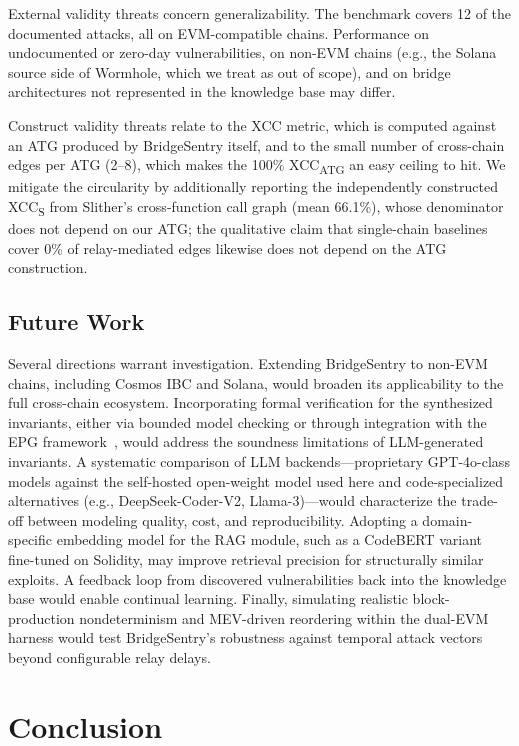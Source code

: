\documentclass[journal]{IEEEtran}
\begin{document}
External validity threats concern generalizability. The benchmark covers 12 of the documented attacks, all on EVM-compatible chains. Performance on undocumented or zero-day vulnerabilities, on non-EVM chains (e.g., the Solana source side of Wormhole, which we treat as out of scope), and on bridge architectures not represented in the knowledge base may differ.

Construct validity threats relate to the XCC metric, which is computed against an ATG produced by BridgeSentry itself, and to the small number of cross-chain edges per ATG (2--8), which makes the 100\% XCC\textsubscript{ATG} an easy ceiling to hit. We mitigate the circularity by additionally reporting the independently constructed XCC\textsubscript{S} from Slither's cross-function call graph (mean 66.1\%), whose denominator does not depend on our ATG; the qualitative claim that single-chain baselines cover 0\% of relay-mediated edges likewise does not depend on the ATG construction.

\subsection{Future Work}

Several directions warrant investigation. Extending BridgeSentry to non-EVM chains, including Cosmos IBC and Solana, would broaden its applicability to the full cross-chain ecosystem. Incorporating formal verification for the synthesized invariants, either via bounded model checking or through integration with the EPG framework~\cite{qin2025epg}, would address the soundness limitations of LLM-generated invariants. A systematic comparison of LLM backends---proprietary GPT-4o-class models against the self-hosted open-weight model used here and code-specialized alternatives (e.g., DeepSeek-Coder-V2, Llama-3)---would characterize the trade-off between modeling quality, cost, and reproducibility. Adopting a domain-specific embedding model for the RAG module, such as a CodeBERT variant fine-tuned on Solidity, may improve retrieval precision for structurally similar exploits. A feedback loop from discovered vulnerabilities back into the knowledge base would enable continual learning. Finally, simulating realistic block-production nondeterminism and MEV-driven reordering within the dual-EVM harness would test BridgeSentry's robustness against temporal attack vectors beyond configurable relay delays.

\section{Conclusion}\label{sec:conclusion}
\end{document}
